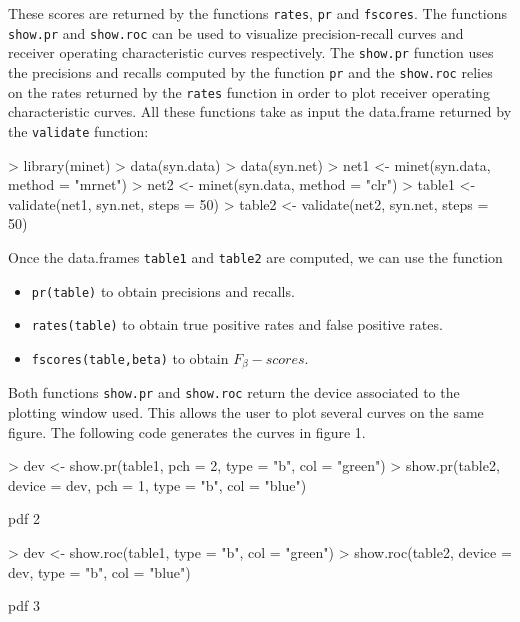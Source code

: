 \documentclass{article}
\newcommand{\Rfunction}[1]{{\texttt{#1}}}
\newcommand{\Robject}[1]{{\texttt{#1}}}
\begin{document}
These scores are returned by the functions \Rfunction{rates}, \Rfunction{pr}
and \Rfunction{fscores}. The functions \Rfunction{show.pr} and \Rfunction{show.roc}
can be used to visualize precision-recall curves and receiver operating 
characteristic curves respectively. The \Rfunction{show.pr} function uses the 
precisions and recalls computed by the function \Rfunction{pr} and the \Rfunction{show.roc}
relies on the rates returned by the \Rfunction{rates} function in order to plot
receiver operating characteristic curves. 
All these functions take as input the data.frame returned by the \Rfunction{validate} 
function:

\begin{Schunk}
\begin{Sinput}
> library(minet)
> data(syn.data)
> data(syn.net)
> net1 <- minet(syn.data, method = "mrnet")
> net2 <- minet(syn.data, method = "clr")
> table1 <- validate(net1, syn.net, steps = 50)
> table2 <- validate(net2, syn.net, steps = 50)
\end{Sinput}
\end{Schunk}

Once the data.frames \Robject{table1} and \Robject{table2} are computed, 
we can use the function
\begin{itemize}
\item \Rfunction{pr(table)} to obtain precisions and recalls.
\item \Rfunction{rates(table)} to obtain true positive rates and false positive rates.
\item \Rfunction{fscores(table,beta)} to obtain $F_{\beta}-scores$.
\end{itemize}
Both functions \Rfunction{show.pr} and \Rfunction{show.roc} return the device 
associated to the plotting window used. This allows the user to plot several 
curves on the same figure. The following code generates the curves in figure 1.
\begin{Schunk}
\begin{Sinput}
> dev <- show.pr(table1, pch = 2, type = "b", col = "green")
> show.pr(table2, device = dev, pch = 1, type = "b", col = "blue")
\end{Sinput}
\begin{Soutput}
pdf 
  2 
\end{Soutput}
\begin{Sinput}
> dev <- show.roc(table1, type = "b", col = "green")
> show.roc(table2, device = dev, type = "b", col = "blue")
\end{Sinput}
\begin{Soutput}
pdf 
  3 
\end{Soutput}
\end{Schunk}
\end{document}
